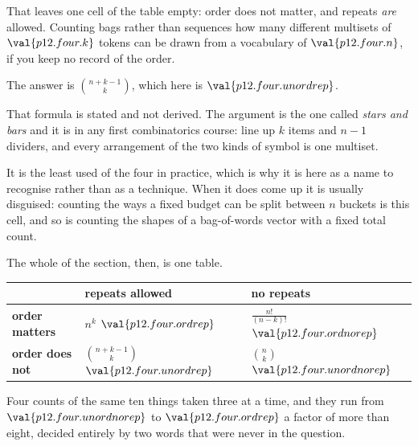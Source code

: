 \begin{fr}
That leaves one cell of the table empty: order does not matter, and repeats
\emph{are} allowed. Counting bags rather than sequences \dash{} how many
different multisets of $\val{p12.four.k}$ tokens can be drawn from a
vocabulary of $\val{p12.four.n}$, if you keep no record of the order.

The answer is $\binom{n + k - 1}{k}$, which here is $\val{p12.four.unordrep}$.

\begin{rigourbox}
That formula is stated and not derived. The argument is the one called
\emph{stars and bars} and it is in any first combinatorics course: line up
$k$ items and $n-1$ dividers, and every arrangement of the two kinds of symbol
is one multiset.

It is the least used of the four in practice, which is why it is here as a
name to recognise rather than as a technique. When it does come up it is
usually disguised: counting the ways a fixed budget can be split between
$n$ buckets is this cell, and so is counting the shapes of a bag-of-words
vector with a fixed total count.
\end{rigourbox}
\end{fr}

\begin{fr}
The whole of the section, then, is one table.

\begin{center}
\begin{tabular}{lll}
\toprule
 & \textbf{repeats allowed} & \textbf{no repeats} \\
\midrule
\textbf{order matters} & $n^{k}$ \dash{} $\val{p12.four.ordrep}$
  & $\frac{n!}{(n-k)!}$ \dash{} $\val{p12.four.ordnorep}$ \\
\textbf{order does not} & $\binom{n+k-1}{k}$ \dash{} $\val{p12.four.unordrep}$
  & $\binom{n}{k}$ \dash{} $\val{p12.four.unordnorep}$ \\
\bottomrule
\end{tabular}
\end{center}

Four counts of the same ten things taken three at a time, and they run from
$\val{p12.four.unordnorep}$ to $\val{p12.four.ordrep}$ \dash{} a factor of
more than eight, decided entirely by two words that were never in the
question.

\end{fr}

